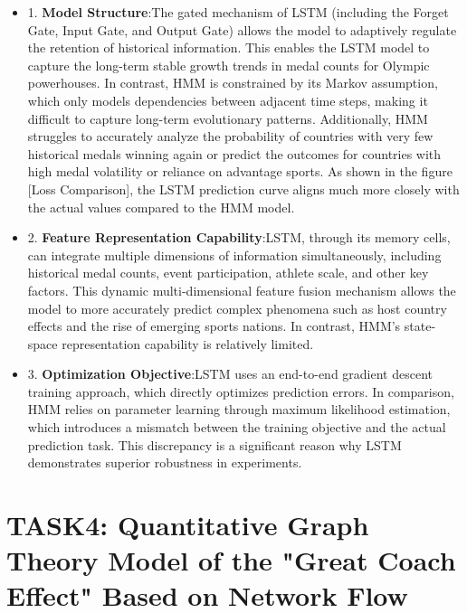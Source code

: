 \documentclass{mcmthesis}
\begin{document}
\begin{itemize}
   \item  1.	{\bf Model Structure}:The gated mechanism of LSTM (including the Forget Gate, Input Gate, and Output Gate) allows the model to adaptively regulate the retention of historical information. This enables the LSTM model to capture the long-term stable growth trends in medal counts for Olympic powerhouses. In contrast, HMM is constrained by its Markov assumption, which only models dependencies between adjacent time steps, making it difficult to capture long-term evolutionary patterns. Additionally, HMM struggles to accurately analyze the probability of countries with very few historical medals winning again or predict the outcomes for countries with high medal volatility or reliance on advantage sports. As shown in the figure [Loss Comparison], the LSTM prediction curve aligns much more closely with the actual values compared to the HMM model.
\item 2.	{\bf Feature Representation Capability}:LSTM, through its memory cells, can integrate multiple dimensions of information simultaneously, including historical medal counts, event participation, athlete scale, and other key factors. This dynamic multi-dimensional feature fusion mechanism allows the model to more accurately predict complex phenomena such as host country effects and the rise of emerging sports nations. In contrast, HMM’s state-space representation capability is relatively limited.
\item 3.	{\bf Optimization Objective}:LSTM uses an end-to-end gradient descent training approach, which directly optimizes prediction errors. In comparison, HMM relies on parameter learning through maximum likelihood estimation, which introduces a mismatch between the training objective and the actual prediction task. This discrepancy is a significant reason why LSTM demonstrates superior robustness in experiments.

\end{itemize}






\section{TASK4: Quantitative Graph Theory Model of the "Great Coach Effect" Based on Network Flow}
\end{document}
